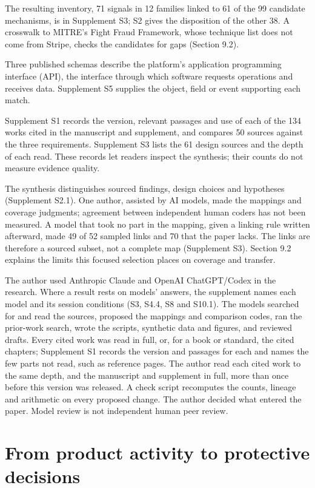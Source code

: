 \documentclass[acmlarge,nonacm]{acmart}
\begin{document}
The resulting inventory, 71 signals in 12 families linked to 61 of the
99 candidate mechanisms, is in Supplement S3; S2 gives the disposition
of the other 38. A crosswalk to MITRE's Fight Fraud Framework, whose
technique list does not come from Stripe, checks the candidates for gaps
(Section 9.2).

Three published schemas describe the platform's application programming
interface (API), the interface through which software requests
operations and receives data. Supplement S5 supplies the object, field
or event supporting each match.

Supplement S1 records the version, relevant passages and use of each of
the 134 works cited in the manuscript and supplement, and compares 50
sources against the three requirements. Supplement S3 lists the 61
design sources and the depth of each read. These records let readers
inspect the synthesis; their counts do not measure evidence quality.

The synthesis distinguishes sourced findings, design choices and
hypotheses (Supplement S2.1). One author, assisted by AI models, made
the mappings and coverage judgments; agreement between independent human
coders has not been measured. A model that took no part in the mapping,
given a linking rule written afterward, made 49 of 52 sampled links and
70 that the paper lacks. The links are therefore a sourced subset, not a
complete map (Supplement S3). Section 9.2 explains the limits this
focused selection places on coverage and transfer.

The author used Anthropic Claude and OpenAI ChatGPT/Codex in the
research. Where a result rests on models' answers, the supplement names
each model and its session conditions (S3, S4.4, S8 and S10.1). The
models searched for and read the sources, proposed the mappings and
comparison codes, ran the prior-work search, wrote the scripts,
synthetic data and figures, and reviewed drafts. Every cited work was
read in full, or, for a book or standard, the cited chapters; Supplement
S1 records the version and passages for each and names the few parts not
read, such as reference pages. The author read each cited work to the
same depth, and the manuscript and supplement in full, more than once
before this version was released. A check script recomputes the counts,
lineage and arithmetic on every proposed change. The author decided what
entered the paper. Model review is not independent human peer review.

\hypertarget{from-product-activity-to-protective-decisions}{%
\section{From product activity to protective
decisions}\label{from-product-activity-to-protective-decisions}}
\end{document}
